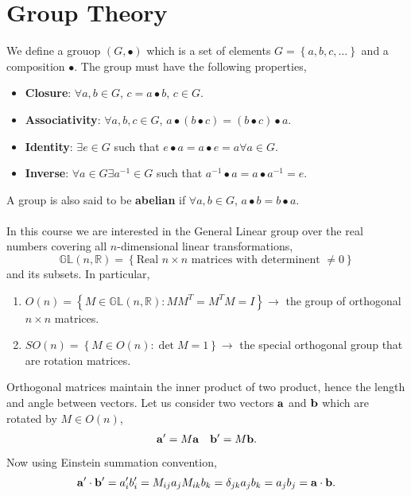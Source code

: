 \documentclass{book}
\begin{document}
\section{Group Theory}
We define a grouop $(G, \bullet)$ which is a set of elements $G = \left\{a,b,c,\ldots\right\}$ and a composition $\bullet$. The group must have the following properties,
\begin{itemize}
	\item \textbf{Closure}: $\forall a,b \in G$, $c = a \bullet b$, $c \in G$.
	\item \textbf{Associativity}: $\forall a,b,c \in G$, $a \bullet(b \bullet c) = (b \bullet c) \bullet a$. 
	\item \textbf{Identity}: $\exists e \in G$ such that $e \bullet a = a \bullet e = a \forall a \in G$. 
	\item \textbf{Inverse}: $\forall a \in G \exists a^{-1} \in G$ such that $a^{-1}\bullet a = a \bullet a^{-1} = e$.
\end{itemize}
A group is also said to be \textbf{abelian} if $\forall a,b \in G$, $a\bullet b = b\bullet a$.
\\\\
In this course we are interested in the General Linear group over the real numbers covering all $n$-dimensional linear transformations,
\begin{equation}
	\mathbb{GL}(n, \mathbb{R}) = \left\{\text{Real $n\times n$ matrices with determinent $\neq 0$}\right\}
\end{equation}
and its subsets. In particular,
\begin{enumerate}
	\item $O(n) = \left\{M \in \mathbb{GL}(n, \mathbb{\mathbb{R}}) : MM^T = M^TM = I\right\} \to$ the group of orthogonal $n\times n$ matrices.
	\item $SO(n) = \left\{M \in O(n) : \det M = 1\right\} \to $ the special orthogonal group that are rotation matrices.
\end{enumerate}
Orthogonal matrices maintain the inner product of two product, hence the length and angle between vectors. Let us consider two vectors $\vb{a}$ and $\vb{b}$ which are rotated by $M \in O(n)$,
\begin{align}
	\vb{a}' = M\vb{a} && \vb{b}' = M\vb{b}.
\end{align}
Now using Einstein summation convention,
\begin{equation}
	\vb{a}' \cdot \vb{b}' = a_i'b_i' = M_{ij}a_jM_{ik}b_k = \delta_{jk}a_jb_k = a_jb_j = \vb{a} \cdot \vb{b}.
\end{equation}
\end{document}
